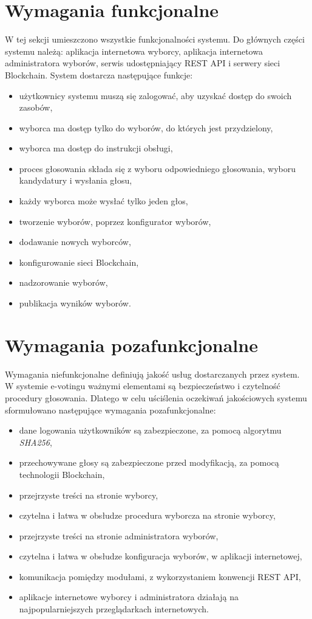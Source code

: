 \documentclass[a4paper,12pt]{book}
\begin{document}
\section {Wymagania funkcjonalne}

W tej sekcji umieszczono wszystkie funkcjonalności systemu. Do głównych części systemu należą: aplikacja internetowa wyborcy, aplikacja internetowa administratora wyborów, serwis udostępniający REST API i serwery sieci Blockchain. System dostarcza następujące funkcje:

\begin{itemize}
	\item użytkownicy systemu muszą się zalogować, aby uzyskać dostęp do swoich zasobów,
	\item wyborca ma dostęp tylko do wyborów, do których jest przydzielony,
	\item wyborca ma dostęp do instrukcji obsługi,
	\item proces głosowania składa się z wyboru odpowiedniego głosowania, wyboru kandydatury i wysłania głosu,
	\item każdy wyborca może wysłać tylko jeden głos,
	\item tworzenie wyborów, poprzez konfigurator wyborów,
	\item dodawanie nowych wyborców,
	\item konfigurowanie sieci Blockchain,
	\item nadzorowanie wyborów,
	\item publikacja wyników wyborów.
\end{itemize}

\section {Wymagania pozafunkcjonalne}

Wymagania niefunkcjonalne definiują jakość usług dostarczanych przez system. W systemie e-votingu ważnymi elementami są bezpieczeństwo i czytelność procedury głosowania. Dlatego w celu uściślenia oczekiwań jakościowych systemu sformułowano następujące wymagania pozafunkcjonalne:

\begin{itemize}
	\item dane logowania użytkowników są zabezpieczone, za pomocą algorytmu \textit{SHA256},
	\item przechowywane głosy są zabezpieczone przed modyfikacją, za pomocą technologii Blockchain,
	\item przejrzyste treści na stronie wyborcy,
	\item czytelna i łatwa w obsłudze procedura wyborcza na stronie wyborcy,
	\item przejrzyste treści na stronie administratora wyborów,
	\item czytelna i łatwa w obsłudze konfiguracja wyborów, w aplikacji internetowej,
	\item komunikacja pomiędzy modułami, z wykorzystaniem konwencji REST API,
	\item aplikacje internetowe wyborcy i administratora działają na najpopularniejszych przeglądarkach internetowych.
\end{itemize}
\end{document}
